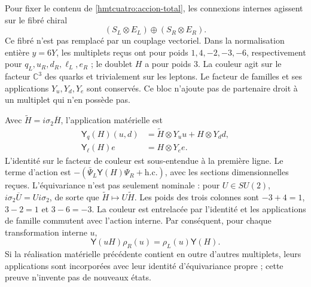 Pour fixer le contenu de \eqref{hmtcuatro:accion-total}, les connexions internes agissent sur le fibré chiral
\[
 (S_L\otimes E_L)\oplus(S_R\otimes E_R).
\]
Ce fibré n’est pas remplacé par un couplage vectoriel. Dans la normalisation entière \(y=6Y\), les multiplets reçus ont pour poids \(1,4,-2,-3,-6\), respectivement pour \(q_L,u_R,d_R,\ell_L,e_R\) ; le doublet \(H\) a pour poids \(3\). La couleur agit sur le facteur \(\mathbb C^3\) des quarks et trivialement sur les leptons. Le facteur de familles et ses applications \(Y_u,Y_d,Y_e\) sont conservés. Ce bloc n’ajoute pas de partenaire droit à un multiplet qui n’en possède pas.

Avec \(\widetilde H=i\sigma_2\overline H\), l’application matérielle est
\begin{equation}
 \begin{split}
 \mathsf Y_q(H)(u,d)&=
       \widetilde H\otimes Y_u u+H\otimes Y_d d,\\
 \mathsf Y_\ell(H)e&=H\otimes Y_e e .
 \end{split}
 \label{hmtcuatro:yukawa}
\end{equation}
L’identité sur le facteur de couleur est sous-entendue à la première ligne. Le terme d’action est \(-(\bar\Psi_L\mathsf Y(H)\Psi_R+\mathrm{h.c.})\), avec les sections dimensionnelles reçues. L’équivariance n’est pas seulement nominale : pour \(U\in SU(2)\), \(i\sigma_2\overline U=U i\sigma_2\), de sorte que \(\widetilde H\mapsto U\widetilde H\). Les poids des trois colonnes sont \(-3+4=1\), \(3-2=1\) et \(3-6=-3\). La couleur est entrelacée par l’identité et les applications de famille commutent avec l’action interne. Par conséquent, pour chaque transformation interne \(u\),
\begin{equation}
 \mathsf Y(uH)\rho_R(u)=\rho_L(u)\mathsf Y(H).
 \label{hmtcuatro:equivariancia-yukawa}
\end{equation}
Si la réalisation matérielle précédente contient en outre d’autres multiplets, leurs applications sont incorporées avec leur identité d’équivariance propre ; cette preuve n’invente pas de nouveaux états.

